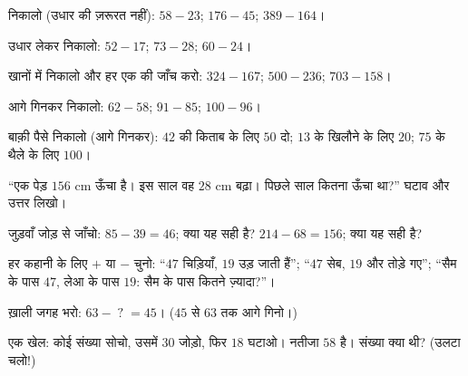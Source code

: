 \begin{exercise}[$\star$]\label{exo:g2:subtraction:1}
निकालो (उधार की ज़रूरत नहीं): $58 - 23$; \quad $176 - 45$; \quad
$389 - 164$।
\end{exercise}

\begin{exercise}[$\star$]\label{exo:g2:subtraction:2}
उधार लेकर निकालो: $52 - 17$; \quad $73 - 28$; \quad
$60 - 24$।
\end{exercise}

\begin{exercise}[$\star$]\label{exo:g2:subtraction:3}
खानों में निकालो और हर एक की जाँच करो: $324 - 167$; \quad
$500 - 236$; \quad $703 - 158$।
\end{exercise}

\begin{exercise}[$\star$]\label{exo:g2:subtraction:4}
आगे गिनकर निकालो: $62 - 58$; \quad $91 - 85$; \quad
$100 - 96$।
\end{exercise}

\begin{exercise}[$\star$]\label{exo:g2:subtraction:5}
बाक़ी पैसे निकालो (आगे गिनकर): $42$ की किताब के लिए $50$ दो; $13$
के खिलौने के लिए $20$; $75$ के थैले के लिए $100$।
\end{exercise}

\begin{exercise}[$\star$]\label{exo:g2:subtraction:6}
``एक पेड़ $156$ cm ऊँचा है। इस साल वह $28$ cm बढ़ा। पिछले साल
कितना ऊँचा था?'' घटाव और उत्तर लिखो।
\end{exercise}

\begin{exercise}[$\star$]\label{exo:g2:subtraction:7}
जुड़वाँ जोड़ से जाँचो: $85 - 39 = 46$; क्या यह सही है?
$214 - 68 = 156$; क्या यह सही है?
\end{exercise}

\begin{exercise}[$\star$]\label{exo:g2:subtraction:8}
हर कहानी के लिए $+$ या $-$ चुनो: ``$47$ चिड़ियाँ, $19$ उड़ जाती हैं'';
``$47$ सेब, $19$ और तोड़े गए''; ``सैम के पास $47$, लेआ के पास $19$:
सैम के पास कितने ज़्यादा?''।
\end{exercise}

\begin{exercise}[$\star$]\label{exo:g2:subtraction:9}
ख़ाली जगह भरो: $63 - \;?\; = 45$। ($45$ से $63$ तक आगे गिनो।)
\end{exercise}

\begin{exercise}[$\star\star$]\label{exo:g2:subtraction:10}
एक खेल: कोई संख्या सोचो, उसमें $30$ जोड़ो, फिर $18$ घटाओ।
नतीजा $58$ है। संख्या क्या थी? (उलटा चलो!)
\end{exercise}
